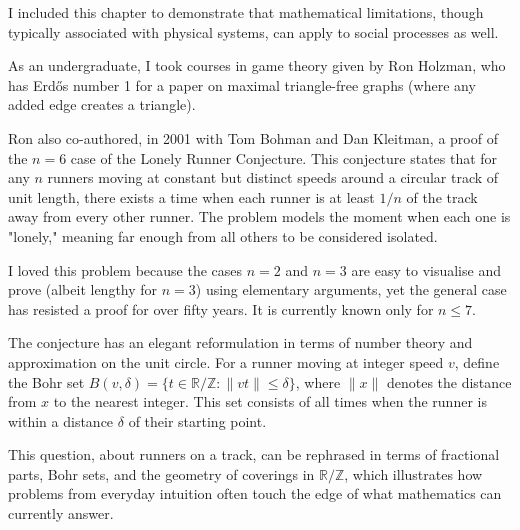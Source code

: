 \begin{commentary}
I included this chapter to demonstrate that mathematical limitations, though typically associated with physical systems, can apply to social processes as well.

As an undergraduate, I took courses in game theory given by Ron Holzman, who has Erdős number 1 for a paper on maximal triangle-free graphs (where any added edge creates a triangle).

Ron also co-authored, in 2001 with Tom Bohman and Dan Kleitman, a proof of the $n = 6$ case of the Lonely Runner Conjecture. This conjecture states that for any $n$ runners moving at constant but distinct speeds around a circular track of unit length, there exists a time when each runner is at least $1/n$ of the track away from every other runner. The problem models the moment when each one is "lonely," meaning far enough from all others to be considered isolated.

I loved this problem because the cases $n = 2$ and $n = 3$ are easy to visualise and prove (albeit lengthy for $n = 3$) using elementary arguments, yet the general case has resisted a proof for over fifty years. It is currently known only for $n \leq 7$.

The conjecture has an elegant reformulation in terms of number theory and approximation on the unit circle. For a runner moving at integer speed $v$, define the Bohr set $B(v,\delta) = \{ t \in \mathbb{R}/\mathbb{Z} : \|vt\| \leq \delta \}$, where $\|x\|$ denotes the distance from $x$ to the nearest integer. This set consists of all times when the runner is within a distance $\delta$ of their starting point.

This question, about runners on a track, can be rephrased in terms of fractional parts, Bohr sets, and the geometry of coverings in $\mathbb{R}/\mathbb{Z}$, which illustrates how problems from everyday intuition often touch the edge of what mathematics can currently answer.
\end{commentary}


